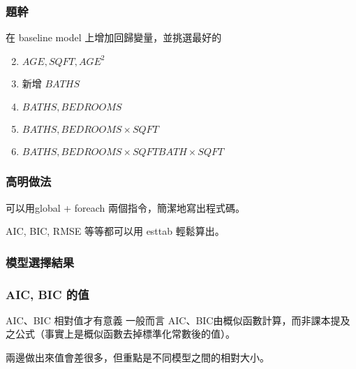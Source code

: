 \begin{frame}
    \frametitle{題幹}

    在 baseline model 上增加回歸變量，並挑選最好的

    \begin{enumerate}
        \setcounter{enumi}{1}
        \item $AGE, SQFT, AGE^2$
        \setcounter{enumi}{8}
        \item 新增 $BATHS$
        \item $BATHS, BEDROOMS$
        \item $BATHS, BEDROOMS \times SQFT$
        \item $BATHS, BEDROOMS \times SQFT BATH \times SQFT$
    \end{enumerate}
\end{frame}

\begin{frame}
    \frametitle{高明做法}
    可以用global + foreach 兩個指令，簡潔地寫出程式碼。

    \vfill

    AIC, BIC, RMSE 等等都可以用 esttab 輕鬆算出。
\end{frame}

\begin{frame}
    \frametitle{模型選擇結果}
    \begin{table}
        \centering
        \scalebox{0.9}{
            
        }
    \end{table}
\end{frame}

\begin{frame}
    \frametitle{AIC, BIC 的值}

    \begin{alertblock}{AIC、BIC 相對值才有意義}
        一般而言 AIC、BIC由概似函數計算，而非課本提及之公式（事實上是概似函數去掉標準化常數後的值）。

        兩邊做出來值會差很多，但重點是不同模型之間的相對大小。
    \end{alertblock}
    

\end{frame}